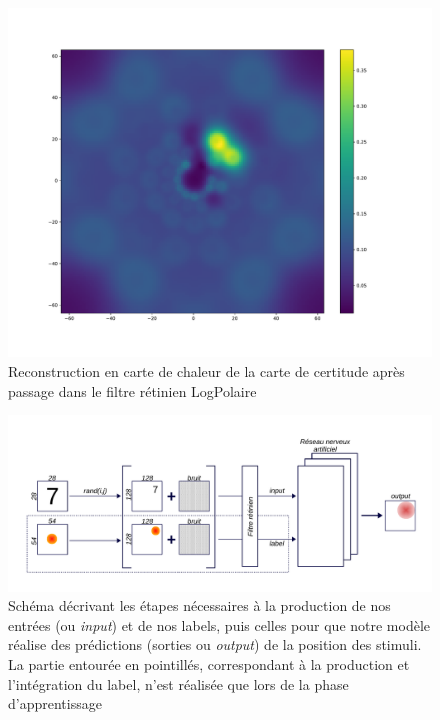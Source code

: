 \begin{figure}[th]
\centering
\includegraphics[scale=0.4]{Figures/accuracy_128_LP}
\decoRule
\caption[Figure]{Reconstruction en carte de chaleur de la carte de certitude après passage dans le filtre rétinien LogPolaire}
\label{fig:accuracy_128_LP}
\end{figure}

\begin{figure}[th]
\centering
\includegraphics[scale=0.65]{Figures/Model}
\decoRule
\caption[Figure]{Schéma décrivant les étapes nécessaires à la production de nos entrées (ou \textit{input}) et de nos labels, puis celles pour que notre modèle réalise des prédictions (sorties ou \textit{output}) de la position des stimuli. La partie entourée en pointillés, correspondant à la production et l'intégration du label, n'est réalisée que lors de la phase d'apprentissage}
\label{fig:model}
\end{figure}

